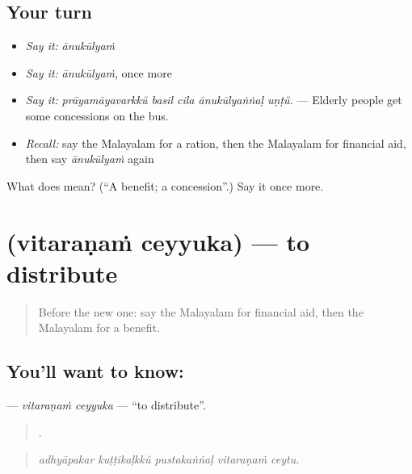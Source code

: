 \subsection*{Your turn}
\begin{itemize}
\raggedright
  \item \emph{Say it:} \emph{ānukūlyaṁ}
  \item \emph{Say it:} \emph{ānukūlyaṁ}, once more
  \item \emph{Say it:} \emph{prāyamāyavarkkŭ basil cila ānukūlyaṅṅaḷ uṇṭŭ.} — Elderly people get some concessions on the bus.
  \item \emph{Recall:} say the Malayalam for a ration, then the Malayalam for financial aid, then say \emph{ānukūlyaṁ} again
\end{itemize}

\begin{tcolorbox}[breakable,colback=teal!4,colframe=teal!35!black,title={Before you move on}]
What does  mean? (\textquotedblleft{}A benefit; a concession\textquotedblright{}.) Say it once more.
\end{tcolorbox}
\section[\texorpdfstring{\ml{വിതരണം} \ml{ചെയ്യുക} (vitaraṇaṁ ceyyuka)}{വിതരണം ചെയ്യുക (vitaraṇaṁ ceyyuka)}]{  (vitaraṇaṁ ceyyuka) — to distribute}

\label{lesson:ML-C429-vitaranam-ceyyuka}



\begin{quote}
Before the new one: say the Malayalam for financial aid, then the Malayalam for a benefit.
\end{quote}

\subsection*{You'll want to know:  }
\textbf{ } — \emph{vitaraṇaṁ ceyyuka} — \textquotedblleft{}to distribute\textquotedblright{}.

\begin{quote}
    .
\end{quote}

\begin{quote}
\emph{adhyāpakar kuṭṭikaḷkkŭ pustakaṅṅaḷ vitaraṇaṁ ceytu.}
\end{quote}

